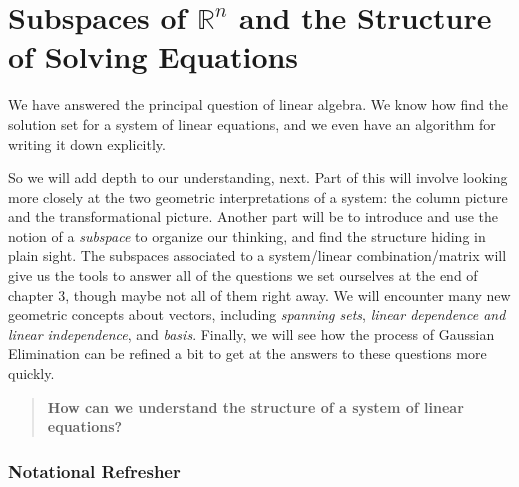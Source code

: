 \documentclass[00-livre-main.tex]{subfiles}
\begin{document}
\chapter{Subspaces of $\mathbb{R}^n$ and the Structure of Solving Equations}

We have answered the principal question of linear algebra. We know how find the solution set for a system of linear equations, and we even have an algorithm for writing it down explicitly. 

So we will add depth to our understanding, next. Part of this will involve looking more closely at the two geometric interpretations of a system: the column picture and the transformational picture. Another part will be to introduce and use the notion of a \emph{subspace} to organize our thinking, and find the structure hiding in plain sight.
The subspaces associated to a system/linear combination/matrix will give us the tools to answer all of the questions we set ourselves at the end of chapter 3, though maybe not all of them right away. We will encounter many new geometric concepts about vectors, including \emph{spanning sets}, \emph{linear dependence and linear independence}, and \emph{basis}. Finally, we will see how the process of Gaussian Elimination can be refined a bit to get at the answers to these questions more quickly.

\begin{quote}
\textbf{How can we understand the structure of a system of linear equations?}
\end{quote}

\subsection*{Notational Refresher}
\end{document}
